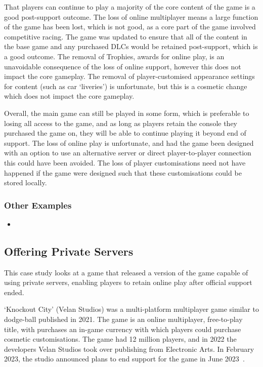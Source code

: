 That players can continue to play a majority of the core content of the game is a good post-support outcome.
The loss of online multiplayer means a large function of the game has been lost, which is not good, as a core part of the game involved competitive racing.
The game was updated to ensure that all of the content in the base game and any purchased DLCs would be retained post-support, which is a good outcome.
The removal of Trophies, awards for online play, is an unavoidable consequence of the loss of online support, however this does not impact the core gameplay.
The removal of player-customised appearance settings for content (such as car `liveries') is unfortunate, but this is a cosmetic change which does not impact the core gameplay.

Overall, the main game can still be played in some form, which is preferable to losing all access to the game,
and as long as players retain the console they purchased the game on, they will be able to continue playing it beyond end of support.
The loss of online play is unfortunate, and had the game been designed with an option to use an alternative server or direct player-to-player connection this could have been avoided.
The loss of player customisations need not have happened if the game were designed such that these customisations could be stored locally.

\subsubsection*{Other Examples}
\begin{itemize}
    \item
\end{itemize}

\subsection{Offering Private Servers}
This case study looks at a game that released a version of the game capable of using private servers,
enabling players to retain online play after official support ended.

`Knockout City' (Velan Studios) was a multi-platform multiplayer game similar to dodge-ball published in 2021.
The game is an online multiplayer, free-to-play title, with purchases an in-game currency with which players could purchase cosmetic customisations.
The game had 12 million players\cite{knockout-stats}, and in 2022 the developers Velan Studios took over publishing from Electronic Arts.
In February 2023, the studio announced plans to end support for the game in June 2023~\cite{knockout-eos-2023}.

